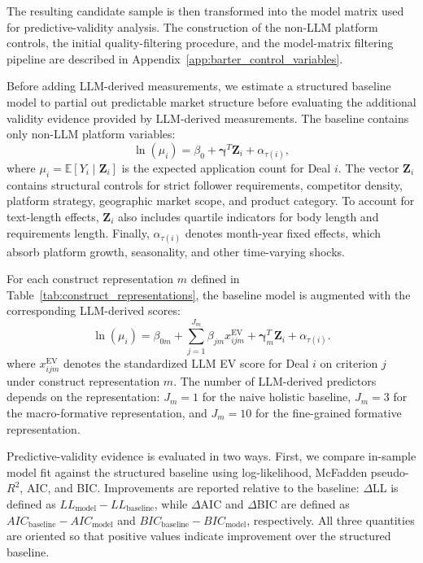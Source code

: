 The resulting candidate sample is then transformed into the model matrix used for predictive-validity analysis. The construction of the non-LLM platform controls, the initial quality-filtering procedure, and the model-matrix filtering pipeline are described in Appendix~\ref{app:barter_control_variables}.


Before adding LLM-derived measurements, we estimate a structured baseline model to partial out predictable market structure before evaluating the additional validity evidence provided by LLM-derived measurements. The baseline contains only non-LLM platform variables:
\begin{equation}\label{eq:barter_base_regression}
    \ln(\mu_i) = \beta_0 + \boldsymbol{\gamma}^{T}\mathbf{Z}_i + \alpha_{\tau(i)},
\end{equation}
where $\mu_i = \mathbb{E}[Y_i \mid \mathbf{Z}_i]$ is the expected application count for Deal $i$. The vector $\mathbf{Z}_i$ contains structural controls for strict follower requirements, competitor density, platform strategy, geographic market scope, and product category. To account for text-length effects, $\mathbf{Z}_i$ also includes quartile indicators for body length and requirements length. Finally, $\alpha_{\tau(i)}$ denotes month-year fixed effects, which absorb platform growth, seasonality, and other time-varying shocks.

For each construct representation $m$ defined in Table~\ref{tab:construct_representations}, the baseline model is augmented with the corresponding LLM-derived scores:
\begin{equation}\label{eq:barter_augmented_regression}
    \ln(\mu_i)
    =
    \beta_{0m}
    +
    \sum_{j=1}^{J_m} \beta_{jm} x^{\mathrm{EV}}_{ijm}
    +
    \boldsymbol{\gamma}_{m}^{T}\mathbf{Z}_i
    +
    \alpha_{\tau(i)}.
\end{equation}
where $x^{\mathrm{EV}}_{ijm}$ denotes the standardized LLM EV score for Deal $i$ on criterion $j$ under construct representation $m$. The number of LLM-derived predictors depends on the representation: $J_m=1$ for the naive holistic baseline, $J_m=3$ for the macro-formative representation, and $J_m=10$ for the fine-grained formative representation.

Predictive-validity evidence is evaluated in two ways. First, we compare in-sample model fit against the structured baseline using log-likelihood, McFadden pseudo-$R^2$, AIC, and BIC. Improvements are reported relative to the baseline: $\Delta$LL is defined as $LL_{\mathrm{model}} - LL_{\mathrm{baseline}}$, while $\Delta$AIC and $\Delta$BIC are defined as $AIC_{\mathrm{baseline}} - AIC_{\mathrm{model}}$ and $BIC_{\mathrm{baseline}} - BIC_{\mathrm{model}}$, respectively. All three quantities are oriented so that positive values indicate improvement over the structured baseline.

